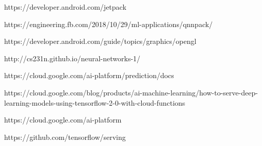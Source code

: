 \begin{thebibliography}{9}
https://developer.android.com/jetpack

https://engineering.fb.com/2018/10/29/ml-applications/qnnpack/

https://developer.android.com/guide/topics/graphics/opengl

http://cs231n.github.io/neural-networks-1/

https://cloud.google.com/ai-platform/prediction/docs

https://cloud.google.com/blog/products/ai-machine-learning/how-to-serve-deep-learning-models-using-tensorflow-2-0-with-cloud-functions

https://cloud.google.com/ai-platform

https://github.com/tensorflow/serving




\end{thebibliography}
